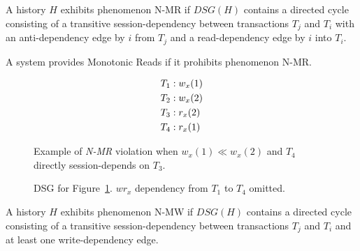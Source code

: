 \begin{definition}
A history $H$ exhibits phenomenon N-MR if $DSG(H)$ contains a directed cycle
consisting of a transitive session-dependency between transactions
$T_j$ and $T_i$ with an anti-dependency edge by $i$ from $T_j$ and a
read-dependency edge by $i$ into $T_i$.
\end{definition}

\begin{definition}
A system provides Monotonic Reads if it prohibits phenomenon N-MR.
\end{definition}


\begin{figure}[H]
\begin{align*}
\small
T_1 &: w_x(1)\\
T_2 &: w_x(2)\\
T_3 &: r_x(2)\\
T_4 &: r_x(1)
\end{align*}
\caption{Example of \textit{N-MR} violation when $w_x(1) \ll w_x(2)$ and $T_4$ directly session-depends on $T_3$.}
\label{fig:nmr-history}
\end{figure}

\begin{figure}[H]
\centering
{}
\caption{DSG for Figure~\ref{fig:nmr-history}. $wr_x$ dependency from $T_1$ to $T_4$ omitted.} 
\label{fig:nmr-dsg}
\end{figure}

\begin{definition}
A history $H$ exhibits phenomenon N-MW if $DSG(H)$ contains a directed cycle
consisting of a transitive session-dependency between transactions
$T_j$ and $T_i$ and at least one write-dependency edge.
\end{definition}



